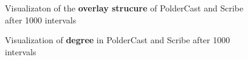 \begin{figure}
{    }
    \caption{Visualizaton of the \textbf{overlay
            strucure} of PolderCast and Scribe after 1000 intervals}
    \label{fig:struct}
\end{figure}

\afterpage{\clearpage}
\begin{figure}
    \centering
    \vspace{-100pt}
    \caption{Visualization of \textbf{degree} in
        PolderCast and Scribe after 1000 intervals}
\end{figure}

